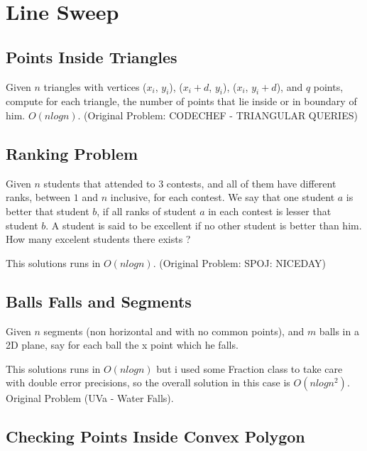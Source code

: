 \documentclass{report}
\begin{document}
        
    \section{Line Sweep}
        \subsection{Points Inside Triangles}
        Given $n$ triangles with vertices {($x_i$, $y_i$), ($x_i + d$, $y_i$), ($x_i$, $y_i + d$)}, and $q$ points, compute for each triangle, the number of points that lie inside or in boundary of him. $O(nlogn)$. (Original Problem: CODECHEF - TRIANGULAR QUERIES)
        
        \subsection{Ranking Problem}
        Given $n$ students that attended to $3$ contests, and all of them have different ranks, between $1$ and $n$ inclusive, for each contest. We say that one student $a$ is better that student $b$, if all ranks of student $a$ in each contest is lesser that student $b$. A student is said to be excellent if no other student is better than him. How many excelent students there exists ?
        
        This solutions runs in $O(nlogn)$. (Original Problem: SPOJ: NICEDAY)
        
        
        
        \subsection{Balls Falls and Segments}
        Given $n$ segments (non horizontal and with no common points), and $m$ balls in a 2D plane, say for each ball the x point which he falls.
        
        This solutions runs in $O(nlogn)$ but i used some Fraction class to take care with double error precisions, so the overall solution in this case is $O(nlogn^2)$. Original Problem (UVa - Water Falls).
        
        
        
        \subsection{Checking Points Inside Convex Polygon}
\end{document}

